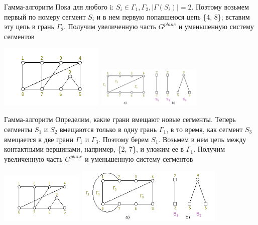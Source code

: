 \documentclass[10pt]{beamer}
\begin{document}
\begin{frame}[fragile]{Гамма-алгоритм}
Пока для любого i: $S_i \in {\Gamma_1, \Gamma_2}, |\Gamma(S_i)| = 2$. Поэтому возьмем первый по номеру сегмент $S_i$ и в нем первую попавшеюся цепь \{4, 8\}; вставим эту цепь в грань $\Gamma_2$. Получим увеличенную часть $G^{plane}$ и уменьшенную систему сегментов
\begin{center}
    \includegraphics[width=5cm]{Term_2/Source/images/5_gamma_1.png}
    \includegraphics[width=5cm]{Term_2/Source/images/5_gamma_4.png}
\end{center}
\end{frame}

\begin{frame}[fragile]{Гамма-алгоритм}
Определим, какие грани вмещают новые сегменты. Теперь сегменты $S_1$ и $S_2$ вмещаются только в одну грань $\Gamma_1$, в то время, как сегмент $S_3$ вмещается в две грани $\Gamma_1$ и $\Gamma_3$. Поэтому берем $S_1$. Возьмем в нем цепь между контактными вершинами, например, \{2, 7\}, и уложим ее в $\Gamma_1$. Получим увеличенную часть $G^{plane}$ и уменьшенную систему сегментов 
\begin{center}
    \includegraphics[width=4cm]{Term_2/Source/images/5_gamma_1.png}
    \includegraphics[width=7cm]{Term_2/Source/images/5_gamma_5.png}
\end{center}
\end{frame}
\end{document}
